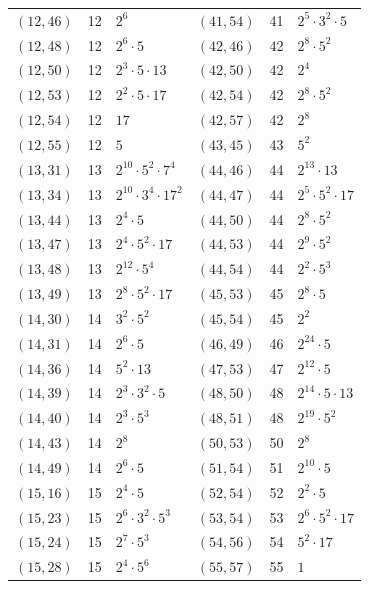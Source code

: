 \documentclass[11pt]{article}
\begin{document}
\begin{longtable}{@{}lrl@{\qquad}lrl@{}}
$(12,46)$ & 12 & $2^{6}$ & $(41,54)$ & 41 & $2^{5}\cdot 3^{2}\cdot 5$\\
$(12,48)$ & 12 & $2^{6}\cdot 5$ & $(42,46)$ & 42 & $2^{8}\cdot 5^{2}$\\
$(12,50)$ & 12 & $2^{3}\cdot 5\cdot 13$ & $(42,50)$ & 42 & $2^{4}$\\
$(12,53)$ & 12 & $2^{2}\cdot 5\cdot 17$ & $(42,54)$ & 42 & $2^{8}\cdot 5^{2}$\\
$(12,54)$ & 12 & $17$ & $(42,57)$ & 42 & $2^{8}$\\
$(12,55)$ & 12 & $5$ & $(43,45)$ & 43 & $5^{2}$\\
$(13,31)$ & 13 & $2^{10}\cdot 5^{2}\cdot 7^{4}$ & $(44,46)$ & 44 & $2^{13}\cdot 13$\\
$(13,34)$ & 13 & $2^{10}\cdot 3^{4}\cdot 17^{2}$ & $(44,47)$ & 44 & $2^{5}\cdot 5^{2}\cdot 17$\\
$(13,44)$ & 13 & $2^{4}\cdot 5$ & $(44,50)$ & 44 & $2^{8}\cdot 5^{2}$\\
$(13,47)$ & 13 & $2^{4}\cdot 5^{2}\cdot 17$ & $(44,53)$ & 44 & $2^{9}\cdot 5^{2}$\\
$(13,48)$ & 13 & $2^{12}\cdot 5^{4}$ & $(44,54)$ & 44 & $2^{2}\cdot 5^{3}$\\
$(13,49)$ & 13 & $2^{8}\cdot 5^{2}\cdot 17$ & $(45,53)$ & 45 & $2^{8}\cdot 5$\\
$(14,30)$ & 14 & $3^{2}\cdot 5^{2}$ & $(45,54)$ & 45 & $2^{2}$\\
$(14,31)$ & 14 & $2^{6}\cdot 5$ & $(46,49)$ & 46 & $2^{24}\cdot 5$\\
$(14,36)$ & 14 & $5^{2}\cdot 13$ & $(47,53)$ & 47 & $2^{12}\cdot 5$\\
$(14,39)$ & 14 & $2^{3}\cdot 3^{2}\cdot 5$ & $(48,50)$ & 48 & $2^{14}\cdot 5\cdot 13$\\
$(14,40)$ & 14 & $2^{3}\cdot 5^{3}$ & $(48,51)$ & 48 & $2^{19}\cdot 5^{2}$\\
$(14,43)$ & 14 & $2^{8}$ & $(50,53)$ & 50 & $2^{8}$\\
$(14,49)$ & 14 & $2^{6}\cdot 5$ & $(51,54)$ & 51 & $2^{10}\cdot 5$\\
$(15,16)$ & 15 & $2^{4}\cdot 5$ & $(52,54)$ & 52 & $2^{2}\cdot 5$\\
$(15,23)$ & 15 & $2^{6}\cdot 3^{2}\cdot 5^{3}$ & $(53,54)$ & 53 & $2^{6}\cdot 5^{2}\cdot 17$\\
$(15,24)$ & 15 & $2^{7}\cdot 5^{3}$ & $(54,56)$ & 54 & $5^{2}\cdot 17$\\
$(15,28)$ & 15 & $2^{4}\cdot 5^{6}$ & $(55,57)$ & 55 & $1$\\
\end{longtable}
\endgroup
\end{document}
